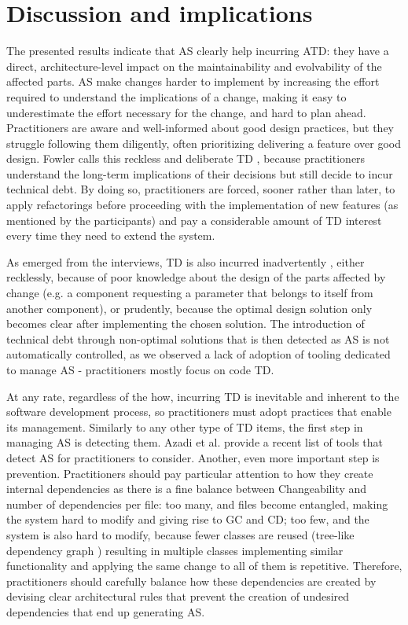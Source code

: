 \section{Discussion and implications}
The presented results indicate that AS clearly help incurring ATD: they have a direct, architecture-level impact on the maintainability and evolvability of the affected parts. AS make changes harder to implement by increasing the effort required to understand the implications of a change, making it easy to underestimate the effort necessary for the change, and hard to plan ahead. Practitioners are aware and well-informed about good design practices, but they struggle following them diligently, often prioritizing delivering a feature over good design. Fowler calls this reckless and deliberate TD \cite{Fowler2014}, because practitioners understand the long-term implications of their decisions but still decide to incur technical debt. By doing so, practitioners are forced, sooner rather than later, to apply refactorings before proceeding with the implementation of new features (as mentioned by the participants) and pay a considerable amount of TD interest every time they need to extend the system. 

As emerged from the interviews, TD is also incurred inadvertently \cite{Fowler2014}, either recklessly, because of poor knowledge about the design of the parts affected by change (e.g. a component requesting a parameter that belongs to itself from another component), or prudently, because the optimal design solution only becomes clear after implementing the chosen solution. The introduction of technical debt through non-optimal solutions that is then detected as AS is not automatically controlled, as we observed a lack of adoption of tooling dedicated to manage AS - practitioners mostly focus on code TD.

At any rate, regardless of the how, incurring TD is inevitable and inherent to the software development process, so practitioners must adopt practices that enable its management. Similarly to any other type of TD items, the first step in managing AS is detecting them. Azadi et al. provide a recent list of tools that detect AS \cite{Azadi2019} for practitioners to consider. Another, even more important step is prevention. Practitioners should pay particular attention to how they create internal dependencies as there is a fine balance between Changeability and number of dependencies per file: too many, and files become entangled, making the system hard to modify and giving rise to GC and CD; too few, and the system is also hard to modify, because fewer classes are reused (tree-like dependency graph  \cite{Lippert2006}) resulting in multiple classes implementing similar functionality and applying the same change to all of them is repetitive. Therefore, practitioners should carefully balance how these dependencies are created by devising clear architectural rules that prevent the creation of undesired dependencies that end up generating AS.


